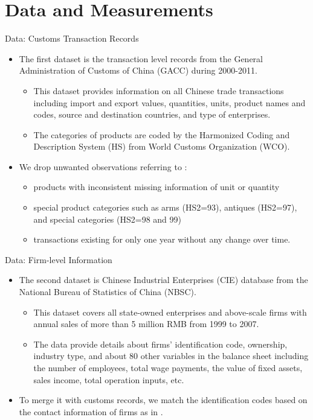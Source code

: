 \documentclass[10pt]{beamer}
\begin{document}
\section{Data and Measurements}

\begin{frame}{Data: Customs Transaction Records}
	\begin{itemize}
		\item The first dataset is the transaction level records from the General Administration of Customs of China (GACC) during 2000-2011.
		\begin{itemize}
			\item This dataset provides information on
			all Chinese trade transactions including import and export values, quantities, units, product names and codes, source and destination countries, and type of enterprises.
			\item The categories of products are coded by the Harmonized Coding and Description System (HS) from World Customs Organization (WCO).
		\end{itemize}
		\item We drop unwanted observations referring to \cite{lmx2015}:
		\begin{itemize}
			\item products with inconsistent missing information of unit or quantity
			\item special product categories such as arms (HS2=93), antiques (HS2=97), and special categories (HS2=98 and 99)
			\item transactions existing for only one year without any change over time.
		\end{itemize}
	\end{itemize}
\end{frame}

\begin{frame}{Data: Firm-level Information}
	\begin{itemize}
		\item The second dataset is Chinese Industrial Enterprises (CIE) database from the National Bureau of Statistics of China (NBSC).
		\begin{itemize}
			\item This dataset covers all state-owned enterprises and above-scale firms
			with annual sales of more than 5 million RMB from 1999 to 2007.
			\item The data provide details about firms’ identification code, ownership, industry
			type, and about 80 other variables in the balance sheet including the number of employees, total wage payments, the value of fixed assets, sales income, total operation inputs, etc.
		\end{itemize}
		\item To merge it with customs records, we match the identification codes based on the contact information of firms as in \cite{fan-li-yeaple2015}.
	\end{itemize}
\end{frame}
\end{document}
